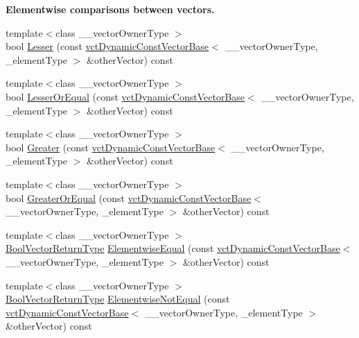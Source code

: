 \begin{Indent}{\bf Elementwise comparisons between vectors.}
\begin{DoxyCompactItemize}
\item 
{\footnotesize template$<$class \-\_\-\-\_\-vector\-Owner\-Type $>$ }\\bool \hyperlink{classvct_dynamic_const_vector_base_a80e4895533a873d7bf6d921ca16ececb}{Lesser} (const \hyperlink{classvct_dynamic_const_vector_base}{vct\-Dynamic\-Const\-Vector\-Base}$<$ \-\_\-\-\_\-vector\-Owner\-Type, \-\_\-element\-Type $>$ \&other\-Vector) const 
\item 
{\footnotesize template$<$class \-\_\-\-\_\-vector\-Owner\-Type $>$ }\\bool \hyperlink{classvct_dynamic_const_vector_base_a53da360deb15a0fc2cdd7a24ff7c13fa}{Lesser\-Or\-Equal} (const \hyperlink{classvct_dynamic_const_vector_base}{vct\-Dynamic\-Const\-Vector\-Base}$<$ \-\_\-\-\_\-vector\-Owner\-Type, \-\_\-element\-Type $>$ \&other\-Vector) const 
\item 
{\footnotesize template$<$class \-\_\-\-\_\-vector\-Owner\-Type $>$ }\\bool \hyperlink{classvct_dynamic_const_vector_base_a0074f5d79e736727d8323e4cf2700d0e}{Greater} (const \hyperlink{classvct_dynamic_const_vector_base}{vct\-Dynamic\-Const\-Vector\-Base}$<$ \-\_\-\-\_\-vector\-Owner\-Type, \-\_\-element\-Type $>$ \&other\-Vector) const 
\item 
{\footnotesize template$<$class \-\_\-\-\_\-vector\-Owner\-Type $>$ }\\bool \hyperlink{classvct_dynamic_const_vector_base_a182a16e5115f869774dcceca504467c1}{Greater\-Or\-Equal} (const \hyperlink{classvct_dynamic_const_vector_base}{vct\-Dynamic\-Const\-Vector\-Base}$<$ \-\_\-\-\_\-vector\-Owner\-Type, \-\_\-element\-Type $>$ \&other\-Vector) const 
\item 
{\footnotesize template$<$class \-\_\-\-\_\-vector\-Owner\-Type $>$ }\\\hyperlink{classvct_dynamic_const_vector_base_a2de5b9c0f8c70782c548808d3ae4a453}{Bool\-Vector\-Return\-Type} \hyperlink{classvct_dynamic_const_vector_base_a548e6c04632b8f779f207f4b5d9b5dbd}{Elementwise\-Equal} (const \hyperlink{classvct_dynamic_const_vector_base}{vct\-Dynamic\-Const\-Vector\-Base}$<$ \-\_\-\-\_\-vector\-Owner\-Type, \-\_\-element\-Type $>$ \&other\-Vector) const 
\item 
{\footnotesize template$<$class \-\_\-\-\_\-vector\-Owner\-Type $>$ }\\\hyperlink{classvct_dynamic_const_vector_base_a2de5b9c0f8c70782c548808d3ae4a453}{Bool\-Vector\-Return\-Type} \hyperlink{classvct_dynamic_const_vector_base_a00a670b1966b5404fe8f861d02d15070}{Elementwise\-Not\-Equal} (const \hyperlink{classvct_dynamic_const_vector_base}{vct\-Dynamic\-Const\-Vector\-Base}$<$ \-\_\-\-\_\-vector\-Owner\-Type, \-\_\-element\-Type $>$ \&other\-Vector) const 

\end{DoxyCompactItemize}
\end{Indent}
